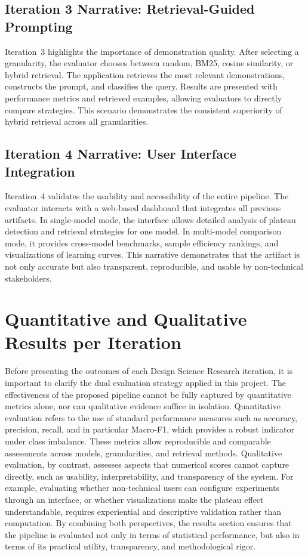 \subsection{Iteration 3 Narrative: Retrieval-Guided Prompting}
Iteration~3 highlights the importance of demonstration quality. After selecting a granularity, the evaluator chooses between random, BM25, cosine similarity, or hybrid retrieval. The application retrieves the most relevant demonstrations, constructs the prompt, and classifies the query. Results are presented with performance metrics and retrieved examples, allowing evaluators to directly compare strategies. This scenario demonstrates the consistent superiority of hybrid retrieval across all granularities.  

\subsection{Iteration 4 Narrative: User Interface Integration}
Iteration~4 validates the usability and accessibility of the entire pipeline. The evaluator interacts with a web-based dashboard that integrates all previous artifacts. In single-model mode, the interface allows detailed analysis of plateau detection and retrieval strategies for one model. In multi-model comparison mode, it provides cross-model benchmarks, sample efficiency rankings, and visualizations of learning curves. This narrative demonstrates that the artifact is not only accurate but also transparent, reproducible, and usable by non-technical stakeholders.  

\section{Quantitative and Qualitative Results per Iteration}
Before presenting the outcomes of each Design Science Research iteration, it is important to clarify the dual evaluation strategy applied in this project. The effectiveness of the proposed pipeline cannot be fully captured by quantitative metrics alone, nor can qualitative evidence suffice in isolation. Quantitative evaluation refers to the use of standard performance measures such as accuracy, precision, recall, and in particular Macro-F1, which provides a robust indicator under class imbalance. These metrics allow reproducible and comparable assessments across models, granularities, and retrieval methods. Qualitative evaluation, by contrast, assesses aspects that numerical scores cannot capture directly, such as usability, interpretability, and transparency of the system. For example, evaluating whether non-technical users can configure experiments through an interface, or whether visualizations make the plateau effect understandable, requires experiential and descriptive validation rather than computation. By combining both perspectives, the results section ensures that the pipeline is evaluated not only in terms of statistical performance, but also in terms of its practical utility, transparency, and methodological rigor.  
